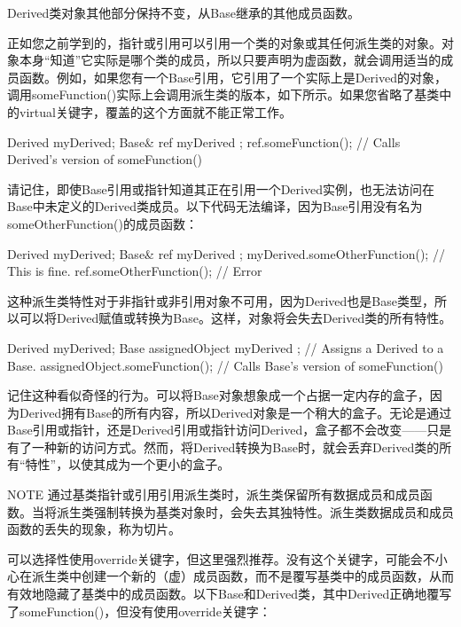 Derived类对象其他部分保持不变，从Base继承的其他成员函数。

正如您之前学到的，指针或引用可以引用一个类的对象或其任何派生类的对象。对象本身“知道”它实际是哪个类的成员，所以只要声明为虚函数，就会调用适当的成员函数。例如，如果您有一个Base引用，它引用了一个实际上是Derived的对象，调用someFunction()实际上会调用派生类的版本，如下所示。如果您省略了基类中的virtual关键字，覆盖的这个方面就不能正常工作。

\begin{cpp}
Derived myDerived;
Base& ref { myDerived };
ref.someFunction(); // Calls Derived's version of someFunction()
\end{cpp}

请记住，即使Base引用或指针知道其正在引用一个Derived实例，也无法访问在Base中未定义的Derived类成员。以下代码无法编译，因为Base引用没有名为someOtherFunction()的成员函数：

\begin{cpp}
Derived myDerived;
Base& ref { myDerived };
myDerived.someOtherFunction(); // This is fine.
ref.someOtherFunction(); // Error
\end{cpp}

这种派生类特性对于非指针或非引用对象不可用，因为Derived也是Base类型，所以可以将Derived赋值或转换为Base。这样，对象将会失去Derived类的所有特性。

\begin{cpp}
Derived myDerived;
Base assignedObject { myDerived }; // Assigns a Derived to a Base.
assignedObject.someFunction(); // Calls Base's version of someFunction()
\end{cpp}

记住这种看似奇怪的行为。可以将Base对象想象成一个占据一定内存的盒子，因为Derived拥有Base的所有内容，所以Derived对象是一个稍大的盒子。无论是通过Base引用或指针，还是Derived引用或指针访问Derived，盒子都不会改变——只是有了一种新的访问方式。然而，将Derived转换为Base时，就会丢弃Derived类的所有“特性”，以使其成为一个更小的盒子。

\begin{myNotic}{NOTE}
通过基类指针或引用引用派生类时，派生类保留所有数据成员和成员函数。当将派生类强制转换为基类对象时，会失去其独特性。派生类数据成员和成员函数的丢失的现象，称为切片。
\end{myNotic}


可以选择性使用override关键字，但这里强烈推荐。没有这个关键字，可能会不小心在派生类中创建一个新的（虚）成员函数，而不是覆写基类中的成员函数，从而有效地隐藏了基类中的成员函数。以下Base和Derived类，其中Derived正确地覆写了someFunction()，但没有使用override关键字：

